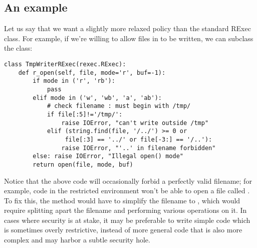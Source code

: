 \subsection{An example}

Let us say that we want a slightly more relaxed policy than the
standard RExec class.  For example, if we're willing to allow files in
 to be written, we can subclass the  class:

\bcode\begin{verbatim}
class TmpWriterRExec(rexec.RExec):
    def r_open(self, file, mode='r', buf=-1):
        if mode in ('r', 'rb'):
            pass
        elif mode in ('w', 'wb', 'a', 'ab'):
            # check filename : must begin with /tmp/
            if file[:5]!='/tmp/': 
                raise IOError, "can't write outside /tmp"
            elif (string.find(file, '/../') >= 0 or
                 file[:3] == '../' or file[-3:] == '/..'):
                raise IOError, "'..' in filename forbidden"
        else: raise IOError, "Illegal open() mode"
        return open(file, mode, buf)
\end{verbatim}\ecode

Notice that the above code will occasionally forbid a perfectly valid
filename; for example, code in the restricted environment won't be
able to open a file called .  To fix this, the
 method would have to simplify the filename to
, which would require splitting apart the filename and
performing various operations on it.  In cases where security is at
stake, it may be preferable to write simple code which is sometimes
overly restrictive, instead of more general code that is also more
complex and may harbor a subtle security hole.
